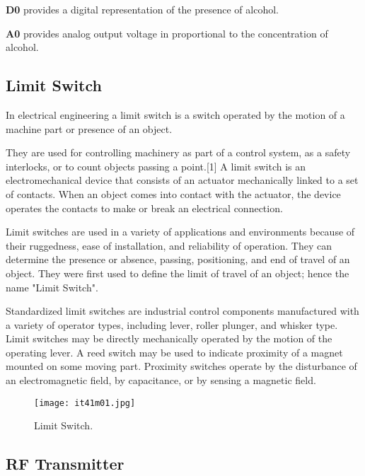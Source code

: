 \textbf{D0 }provides a digital representation of the presence of alcohol.

\textbf{A0} provides analog output voltage in proportional to the concentration of alcohol.

\subsection{Limit Switch}

In electrical engineering a limit switch is a switch operated by the motion of a machine part or presence of an object.
\vspace{.3cm}

They are used for controlling machinery as part of a control system, as a safety interlocks, or to count objects passing a point.[1] A limit switch is an electromechanical device that consists of an actuator mechanically linked to a set of contacts. When an object comes into contact with the actuator, the device operates the contacts to make or break an electrical connection.\vspace{.3cm}

Limit switches are used in a variety of applications and environments because of their ruggedness, ease of installation, and reliability of operation. They can determine the presence or absence, passing, positioning, and end of travel of an object. They were first used to define the limit of travel of an object; hence the name "Limit Switch".\vspace{.3cm}

Standardized limit switches are industrial control components manufactured with a variety of operator types, including lever, roller plunger, and whisker type. Limit switches may be directly mechanically operated by the motion of the operating lever. A reed switch may be used to indicate proximity of a magnet mounted on some moving part. Proximity switches operate by the disturbance of an electromagnetic field, by capacitance, or by sensing a magnetic field.\vspace{.3cm}

\begin{figure}[h]
	\centering
	\texttt{[image: it41m01.jpg]}
	\caption{Limit Switch.}
\end{figure}

\subsection{RF Transmitter}

